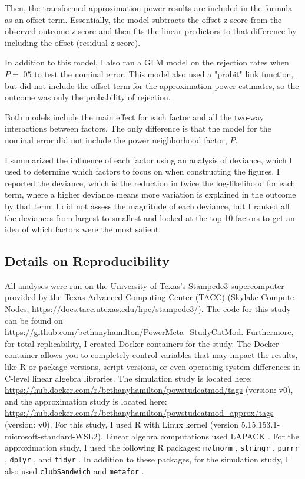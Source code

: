 Then, the transformed approximation power results are included in the formula as an offset term. Essentially, the model subtracts the offset z-score from the observed outcome z-score and then fits the linear predictors to that difference by including the offset (residual z-score).

In addition to this model, I also ran a GLM model on the rejection rates when $P=.05$ to test the nominal error. This model also used a "probit" link function, but did not include the offset term for the approximation power estimates, so the outcome was only the probability of rejection. 

Both models include the main effect for each factor and all the two-way interactions between factors. The only difference is that the model for the nominal error did not include the power neighborhood factor, $P$.  

I summarized the influence of each factor using an analysis of deviance, which I used to determine which factors to focus on when constructing the figures. I reported the deviance, which is the reduction in twice the log-likelihood for each term, where a higher deviance means more variation is explained in the outcome by that term. I did not assess the magnitude of each deviance, but I ranked all the deviances from largest to smallest and looked at the top 10 factors to get an idea of which factors were the most salient. 


\subsection{Details on Reproducibility}

All analyses were run on the University of Texas's Stampede3 supercomputer provided by the Texas Advanced Computing Center (TACC) (Skylake Compute Nodes; \url{https://docs.tacc.utexas.edu/hpc/stampede3/}). The code for this study can be found on \url{https://github.com/bethanyhamilton/PowerMeta_StudyCatMod}. Furthermore, for total replicability, I created Docker containers for the study. The Docker container allows you to completely control variables that may impact the results, like R or package versions, script versions, or even operating system differences in C-level linear algebra libraries. The simulation study is located here: \url{https://hub.docker.com/r/bethanyhamilton/powstudcatmod/tags} (version: v0), and the approximation study is located here: \url{https://hub.docker.com/r/bethanyhamilton/powstudcatmod_approx/tags} (version: v0). For this study, I used R \autocite[version 4.4.2;][]{R} with Linux kernel (version 5.15.153.1-microsoft-standard-WSL2). Linear algebra computations used LAPACK \autocite[version 3.12.0;][]{lapack99}. For the approximation study, I used the following R packages:
\texttt{mvtnorm}  \autocite[version 1.3-3;][]{mvtnorm}, \texttt{stringr}  \autocite[version 1.5.1;][]{stringr}, \texttt{purrr} \autocite[version 1.0.41;][]{purrr}, \texttt{dplyr} \autocite[version 1.1.4;][]{dplyr}, and \texttt{tidyr} \autocite[version 1.3.1;][]{tidyr}. In addition to these packages, for the simulation study, I also used \texttt{clubSandwich} \autocite[version 0.5.11;][]{pustejovsky2024a}  and \texttt{metafor} \autocite[version 4.8-0;][]{viechtbauer2010a}.


